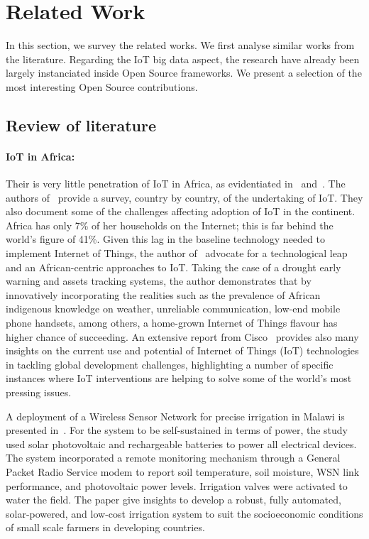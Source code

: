 \section{Related Work}
\label{sec:relworks}

In this section, we survey the related works.
We first analyse similar works from the literature.
Regarding the IoT big data aspect, the research have already been largely instanciated inside Open Source frameworks.
We present a selection of the most interesting Open Source contributions.

\subsection{Review of literature}

\paragraph{IoT in Africa:}
Their is very little penetration of IoT in Africa, as evidentiated in~\cite{Onyalo2015} and~\cite{Masinde2014}.
The authors of~\cite{Onyalo2015} provide a survey, country by country, of the undertaking of IoT.
They also document some of the challenges affecting adoption of IoT in the continent.
Africa has only 7\% of her households on the Internet; this is far behind the world’s figure of 41\%.
Given this lag in the baseline technology needed to implement Internet of Things, the author of~\cite{Masinde2014} advocate for a technological leap and an African-centric approaches to IoT.
Taking the case of a drought early warning and assets tracking systems, the author demonstrates that by innovatively incorporating the realities such as the prevalence of African indigenous knowledge on weather, unreliable communication, low-end mobile phone handsets, among others, a home-grown Internet of Things flavour has higher chance of succeeding.
An extensive report from Cisco~\cite{ITU2015} provides also many insights on the current use and potential of Internet of Things (IoT) technologies in tackling global development challenges, highlighting a number of specific instances where IoT interventions are helping to solve some of the world’s most pressing issues.


A deployment of a Wireless Sensor Network for precise irrigation in Malawi is presented in~\cite{Mafuta2013}.
For the system to be self-sustained in terms of power, the study used solar photovoltaic and rechargeable batteries to power all electrical devices.
The system incorporated a remote monitoring mechanism through a General Packet Radio Service modem to report soil temperature, soil moisture, WSN
link performance, and photovoltaic power levels. 
Irrigation valves were activated to water the field.
The paper give insights to develop a robust, fully automated, solar-powered, and low-cost irrigation system to suit the socioeconomic conditions of small scale farmers in developing countries.

